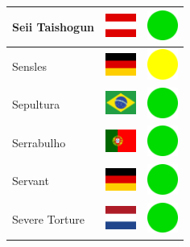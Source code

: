 \documentclass[12pt, a4paper, twoside]{report}
\begin{document}
\begin{center}
\begin{longtable}{|p{5cm}|p{2cm}|p{2cm}|}
Seii Taishogun & \includegraphics[width=1cm]{4x3/at} & \includegraphics[width=1cm]{likes/y} \\ \hline
Sensles & \includegraphics[width=1cm]{4x3/de} & \includegraphics[width=1cm]{likes/m} \\ \hline
Sepultura & \includegraphics[width=1cm]{4x3/br} & \includegraphics[width=1cm]{likes/y} \\ \hline
Serrabulho & \includegraphics[width=1cm]{4x3/pt} & \includegraphics[width=1cm]{likes/y} \\ \hline
Servant & \includegraphics[width=1cm]{4x3/de} & \includegraphics[width=1cm]{likes/y} \\ \hline
Severe Torture & \includegraphics[width=1cm]{4x3/nl} & \includegraphics[width=1cm]{likes/y} \\ \hline

\end{longtable}
\end{center}
\end{document}
